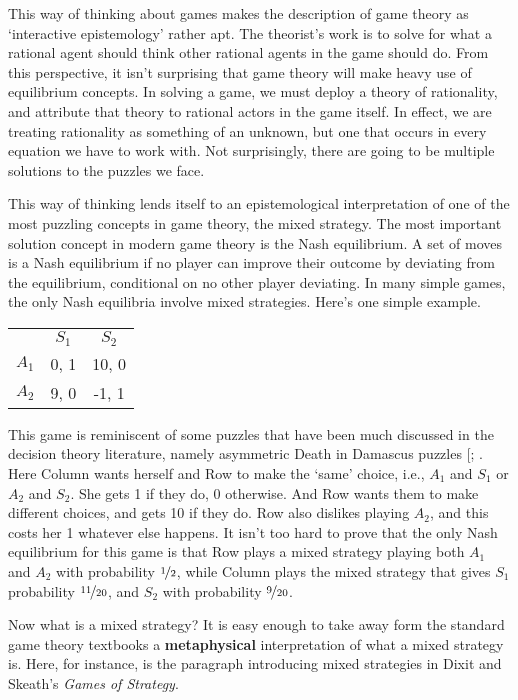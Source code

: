 \documentclass[11pt,]{book}
\def\toprule{}
\def\bottomrule{}
\begin{document}
This way of thinking about games makes the description of game theory as `interactive epistemology' \citep{Aumann1999} rather apt. The theorist's work is to solve for what a rational agent should think other rational agents in the game should do. From this perspective, it isn't surprising that game theory will make heavy use of equilibrium concepts. In solving a game, we must deploy a theory of rationality, and attribute that theory to rational actors in the game itself. In effect, we are treating rationality as something of an unknown, but one that occurs in every equation we have to work with. Not surprisingly, there are going to be multiple solutions to the puzzles we face.

This way of thinking lends itself to an epistemological interpretation of one of the most puzzling concepts in game theory, the mixed strategy. The most important solution concept in modern game theory is the Nash equilibrium. A set of moves is a Nash equilibrium if no player can improve their outcome by deviating from the equilibrium, conditional on no other player deviating. In many simple games, the only Nash equilibria involve mixed strategies. Here's one simple example.

\begin{longtable}[]{@{}lcc@{}}
\toprule
\endhead
& \(S_1\) & \(S_2\)\tabularnewline
\(A_1\) & 0, 1 & 10, 0\tabularnewline
\(A_2\) & 9, 0 & -1, 1\tabularnewline
\bottomrule
\end{longtable}

This game is reminiscent of some puzzles that have been much discussed in the decision theory literature, namely asymmetric Death in Damascus puzzles {[}\citet{Richter1984}; . Here Column wants herself and Row to make the `same' choice, i.e., \(A_1\) and \(S_1\) or \(A_2\) and \(S_2\). She gets 1 if they do, 0 otherwise. And Row wants them to make different choices, and gets 10 if they do. Row also dislikes playing \(A_2\), and this costs her 1 whatever else happens. It isn't too hard to prove that the only Nash equilibrium for this game is that Row plays a mixed strategy playing both \(A_1\) and \(A_2\) with probability \(\nicefrac{1}{2}\), while Column plays the mixed strategy that gives \(S_1\) probability \(\nicefrac{11}{20}\), and \(S_2\) with probability \(\nicefrac{9}{20}\).

Now what is a mixed strategy? It is easy enough to take away form the standard game theory textbooks a \textbf{metaphysical} interpretation of what a mixed strategy is. Here, for instance, is the paragraph introducing mixed strategies in Dixit and Skeath's \emph{Games of Strategy}.
\end{document}
